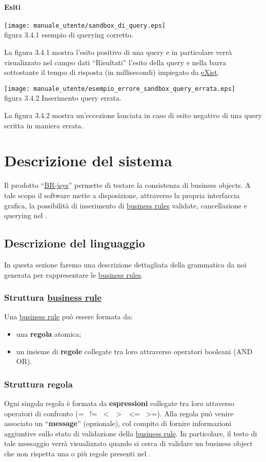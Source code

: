 \subsubsection{Esiti}
\begin{center}
\texttt{[image: manuale\_utente/sandbox\_di\_query.eps]}\\
 figura 3.4.1 esempio di querying corretto.
\end{center}
La figura 3.4.1 mostra l'esito positivo di una query e in particolare verr\`a visualizzato nel campo dati ``Risultati'' l'esito della query e nella barra sottostante il tempo di risposta (in millisecondi) impiegato da \underline{eXist}. 

\begin{center}
\texttt{[image: manuale\_utente/esempio\_errore\_sandbox\_query\_errata.eps]}\\
figura 3.4.2 Inserimento query errata.
\end{center}
La figura 3.4.2 mostra un'eccezione lanciata in caso di esito negativo di una query scritta in maniera errata.


\chapter{Descrizione del sistema}
Il prodotto ``\underline{BR-jsys}'' permette di testare la consistenza di business objects. A tale scopo il software mette a disposizione, attraverso la propria interfaccia grafica, la possibilit\`a di inserimento di \underline{business rules} validate, cancellazione e querying nel \rp.
\section{Descrizione del linguaggio}
In questa sezione faremo una descrizione dettagliata della grammatica da noi generata per rappresentare le \underline{business rules}. 
\subsection{Struttura \underline{business rule}}
Una \underline{business rule} pu\`o essere formata da:
\begin{itemize}
\item una \textbf{regola} atomica;
\item un insieme di \textbf{regole} collegate tra loro attraverso operatori booleani (AND \textbar OR).
\end{itemize}
\subsection{Struttura regola}
Ogni singola regola \`e formata da \textbf{espressioni} collegate tra loro attaverso operatori di confronto (= \textbar\ != \textbar\ \textless\ \textbar\ \textgreater\ \textbar\ \textless= \textbar\ \textgreater=). Alla regola pu\`o venire associato un ``\textbf{message}'' (opzionale), col compito di fornire informazioni aggiuntive sullo stato di validazione della \underline{business rule}. In particolare, il testo di tale messaggio verr\`a visualizzato quando si cerca di validare un business object che non rispetta una o pi\`u regole presenti nel \rp.
